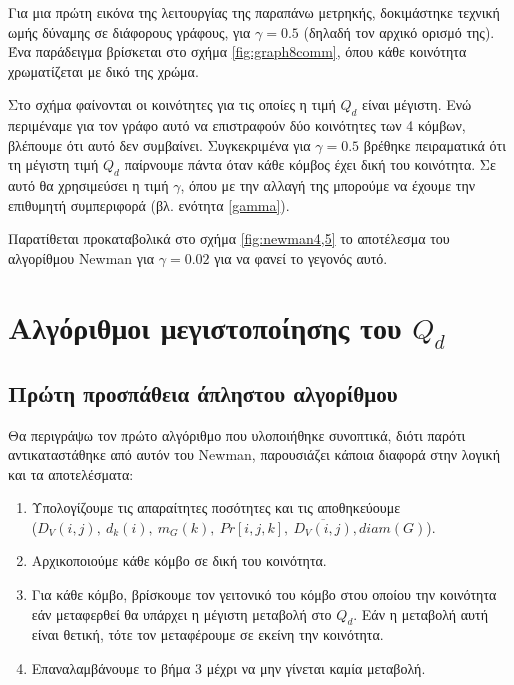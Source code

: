 \documentclass[10pt, letterpaper]{article}
\newcommand{\en}{\selectlanguage{english}}
\newcommand{\gr}{\selectlanguage{greek}}
\begin{document}
Για μια πρώτη εικόνα της λειτουργίας της παραπάνω μετρηκής, δοκιμάστηκε τεχνική ωμής δύναμης σε διάφορους γράφους,
για $\gamma = 0.5$ (δηλαδή τον αρχικό ορισμό της).
Ένα παράδειγμα βρίσκεται στο σχήμα \ref{fig:graph8comm}, όπου κάθε κοινότητα χρωματίζεται με δικό της χρώμα. 

Στο σχήμα φαίνονται οι κοινότητες για τις οποίες η τιμή $Q_d$ είναι μέγιστη. Ενώ περιμέναμε για τον γράφο αυτό να επιστραφούν 
δύο κοινότητες των 4 κόμβων, βλέπουμε ότι αυτό δεν συμβαίνει. Συγκεκριμένα για $\gamma = 0.5$ βρέθηκε πειραματικά ότι 
τη μέγιστη τιμή $Q_d$ παίρνουμε πάντα όταν κάθε κόμβος έχει δική του κοινότητα. Σε αυτό θα χρησιμεύσει η τιμή $\gamma$, όπου με την 
αλλαγή της μπορούμε να έχουμε την επιθυμητή συμπεριφορά (βλ. ενότητα \ref{gamma}).

Παρατίθεται προκαταβολικά στο σχήμα \ref{fig:newman4,5} το αποτέλεσμα του αλγορίθμου \textlatin{Newman} για $\gamma = 0.02$ για να φανεί 
το γεγονός αυτό.





\pagebreak




\section{Αλγόριθμοι μεγιστοποίησης του $Q_d$}



\subsection{Πρώτη προσπάθεια άπληστου αλγορίθμου}

Θα περιγράψω τον πρώτο αλγόριθμο που υλοποιήθηκε συνοπτικά, διότι παρότι αντικαταστάθηκε 
από αυτόν του \en Newman, \gr παρουσιάζει κάποια διαφορά στην λογική και τα αποτελέσματα:

\begin{enumerate}
  \item Υπολογίζουμε τις απαραίτητες ποσότητες και τις αποθηκεύουμε \\ ($D_V(i,j), \ d_k(i), \ m_G(k), \ Pr[i,j,k],  \ \overline{D_V(i,j)},diam(G)$).
  \item Αρχικοποιούμε κάθε κόμβο σε δική του κοινότητα.
  \item Για κάθε κόμβο, βρίσκουμε τον γειτονικό του κόμβο στου οποίου την κοινότητα 
  εάν μεταφερθεί θα υπάρχει η μέγιστη μεταβολή στο $Q_d$. Εάν η μεταβολή αυτή είναι θετική,
  τότε τον μεταφέρουμε σε εκείνη την κοινότητα.
  \item Επαναλαμβάνουμε το βήμα 3 μέχρι να μην γίνεται καμία μεταβολή.
\end{enumerate}
\end{document}
